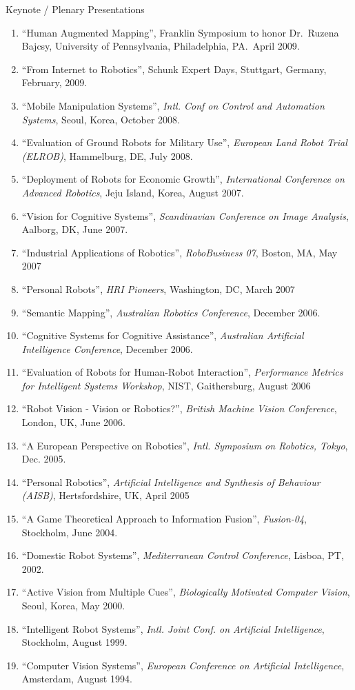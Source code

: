 \documentclass{article}
\begin{document}
\begin{cv}
\begin{cvlist}{Keynote / Plenary Presentations}
\begin{enumerate}
			\item ``Human Augmented Mapping'', Franklin Symposium to honor Dr.\ Ruzena Bajcsy, University of Pennsylvania, Philadelphia,
			      PA.\ April 2009.
			\item ``From Internet to Robotics'', Schunk Expert Days, Stuttgart, Germany, February, 2009.
			\item ``Mobile Manipulation Systems'', {\em Intl. Conf on Control
				      and Automation Systems}, Seoul, Korea, October 2008.
			\item ``Evaluation of Ground Robots for Military Use'', {\em
				      European Land Robot Trial (ELROB)}, Hammelburg, DE, July 2008.
			\item ``Deployment of Robots for Economic Growth'', {\em
				      International Conference on Advanced Robotics}, Jeju Island,
			      Korea, August 2007.
			\item ``Vision for Cognitive Systems'', {\em Scandinavian Conference
				      on Image Analysis}, Aalborg, DK, June 2007.
			\item ``Industrial Applications of Robotics'', {\em RoboBusiness
				      07}, Boston, MA, May 2007
			\item ``Personal Robots'', {\em HRI Pioneers}, Washington, DC, March
			      2007
			\item ``Semantic Mapping'', {\em Australian Robotics Conference},
			      December 2006.
			\item ``Cognitive Systems for Cognitive Assistance'', {\em
				      Australian Artificial Intelligence Conference}, December 2006.
			\item ``Evaluation of Robots for Human-Robot Interaction'', {\em
				      Performance Metrics for Intelligent Systems Workshop}, NIST,
			      Gaithersburg, August 2006
			\item ``Robot Vision - Vision or Robotics?'', {\em British Machine
				      Vision Conference}, London, UK, June 2006.
			\item ``A European Perspective on Robotics'', {\em Intl. Symposium
				      on Robotics, Tokyo}, Dec. 2005.
			\item ``Personal Robotics'', {\em Artificial Intelligence and
				      Synthesis of Behaviour (AISB)}, Hertsfordshire, UK, April 2005
			\item ``A Game Theoretical Approach to Information Fusion'', {\em
				      Fusion-04}, Stockholm, June 2004.
			\item ``Domestic Robot Systems'', {\em Mediterranean Control
				      Conference}, Lisboa, PT, 2002.
			\item ``Active Vision from Multiple Cues'', {\em Biologically
				      Motivated Computer Vision}, Seoul, Korea, May 2000.
			\item ``Intelligent Robot Systems'', {\em Intl. Joint Conf. on Artificial
				      Intelligence}, Stockholm, August 1999.
			\item ``Computer Vision Systems'', {\em European Conference on
				      Artificial Intelligence}, Amsterdam, August 1994.
		\end{enumerate}
	\end{cvlist}


\end{cv}
\end{document}
